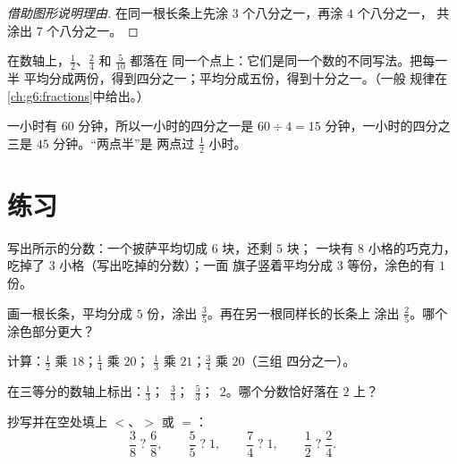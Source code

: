 \begin{proof}[借助图形说明理由]
在同一根长条上先涂 $3$ 个八分之一，再涂 $4$ 个八分之一，
共涂出 $7$ 个八分之一。
\end{proof}

\begin{example}\label{ex:g4:fractions:equal}
在数轴上，$\frac12$、$\frac24$ 和 $\frac{5}{10}$ 都落在
同一个点上：它们是同一个数的不同写法。把每一半
平均分成两份，得到四分之一；平均分成五份，得到十分之一。（一般
规律在\cref{ch:g6:fractions}中给出。）
\end{example}

\begin{example}[一小时的四分之一]\label{ex:g4:fractions:hour}
一小时有 $60$ 分钟，所以一小时的四分之一是
$60 \div 4 = 15$ 分钟，一小时的四分之三是
$45$ 分钟。“两点半”是
两点过 $\frac12$ 小时。
\end{example}

\section{练习}

\begin{exercise}[$\star$]\label{exo:g4:fractions:1}
写出所示的分数：一个披萨平均切成 $6$ 块，还剩 $5$ 块；
一块有 $8$ 小格的巧克力，吃掉了 $3$ 小格（写出吃掉的分数）；一面
旗子竖着平均分成 $3$ 等份，涂色的有 $1$ 份。
\end{exercise}

\begin{exercise}[$\star$]\label{exo:g4:fractions:2}
画一根长条，平均分成 $5$ 份，涂出 $\frac35$。再在另一根同样长的长条上
涂出 $\frac{2}{5}$。哪个涂色部分更大？
\end{exercise}

\begin{exercise}[$\star$]\label{exo:g4:fractions:3}
计算：$\frac12$ 乘 $18$；\quad $\frac14$ 乘 $20$；\quad
$\frac13$ 乘 $21$；\quad $\frac34$ 乘 $20$（三组
四分之一）。
\end{exercise}

\begin{exercise}[$\star$]\label{exo:g4:fractions:4}
在三等分的数轴上标出：$\frac13$；\ $\frac33$；\
$\frac53$；\ $2$。哪个分数恰好落在 $2$ 上？
\end{exercise}

\begin{exercise}[$\star$]\label{exo:g4:fractions:5}
抄写并在空处填上 $<$、$>$ 或 $=$：
\[
\frac38 \;?\; \frac68, \qquad
\frac55 \;?\; 1, \qquad
\frac74 \;?\; 1, \qquad
\frac12 \;?\; \frac24 .
\]
\end{exercise}

